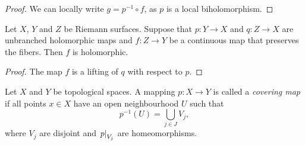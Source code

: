 \begin{proof}
We can locally write $g = p^{-1} \circ f$, as $p$ is a local
biholomorphism.
\end{proof}

\begin{posledica}
Let $X$, $Y$ and $Z$ be Riemann surfaces. Suppose that
$p \colon Y \to X$ and $q \colon Z \to X$ are unbranched
holomorphic maps and $f \colon Z \to Y$ be a continuous map that
preserves the fibers. Then $f$ is holomorphic.
\end{posledica}

\begin{proof}
The map $f$ is a lifting of $q$ with respect to $p$.
\end{proof}

\begin{definicija}
Let $X$ and $Y$ be topological spaces. A mapping $p \colon X \to Y$
is called a \emph{covering map} if all points
$x \in X$ have an open neighbourhood $U$ such that
\[
p^{-1}(U) = \bigcup_{j \in J} V_j,
\]
where $V_j$ are disjoint and $\left. p\right|_{V_j}^{}$ are homeomorphisms.
\end{definicija}

